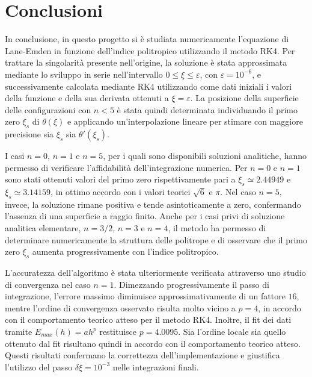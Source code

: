 \documentclass{article}
\numberwithin{equation}{section}
\begin{document}
\section{Conclusioni}
In conclusione, in questo progetto si è studiata numericamente l'equazione di Lane-Emden in funzione dell'indice politropico utilizzando il metodo RK4. Per trattare la singolarità presente nell'origine, la soluzione è stata approssimata mediante lo sviluppo in serie nell'intervallo $0 \leq \xi \leq \varepsilon$, con $\varepsilon = 10^{-6}$, e successivamente calcolata mediante RK4 utilizzando come dati iniziali i valori della funzione e della sua derivata ottenuti a $\xi = \varepsilon$. La posizione della superficie delle configurazioni con $n < 5$ è stata quindi determinata individuando il primo zero $\xi_s$ di $\theta(\xi)$ e applicando un'interpolazione lineare per stimare con maggiore precisione sia $\xi_s$ sia $\theta'(\xi_s)$.

I casi $n = 0$, $n = 1$ e $n = 5$, per i quali sono disponibili soluzioni analitiche, hanno permesso di verificare l'affidabilità dell'integrazione numerica. Per $n = 0$ e $n = 1$ sono stati ottenuti valori del primo zero rispettivamente pari a $\xi_s \simeq 2.44949$ e $\xi_s \simeq 3.14159$, in ottimo accordo con i valori teorici $\sqrt{6}$ e $\pi$. Nel caso $n = 5$, invece, la soluzione rimane positiva e tende asintoticamente a zero, confermando l'assenza di una superficie a raggio finito. Anche per i casi privi di soluzione analitica elementare, $n = 3/2$, $n = 3$ e $n = 4$, il metodo ha permesso di determinare numericamente la struttura delle politrope e di osservare che il primo zero $\xi_s$ aumenta progressivamente con l'indice politropico.

L'accuratezza dell'algoritmo è stata ulteriormente verificata attraverso uno studio di convergenza nel caso $n = 1$. Dimezzando progressivamente il passo di integrazione, l'errore massimo diminuisce approssimativamente di un fattore $16$, mentre l'ordine di convergenza osservato risulta molto vicino a $p = 4$, in accordo con il comportamento teorico atteso per il metodo RK4. Inoltre, il fit dei dati tramite $E_{max}(h) = ah^p$ restituisce $p = 4.0095$. Sia l'ordine locale sia quello ottenuto dal fit risultano quindi in accordo con il comportamento teorico atteso. Questi risultati confermano la correttezza dell'implementazione e giustifica l'utilizzo del passo $\delta\xi = 10^{-3}$ nelle integrazioni finali.
\end{document}
